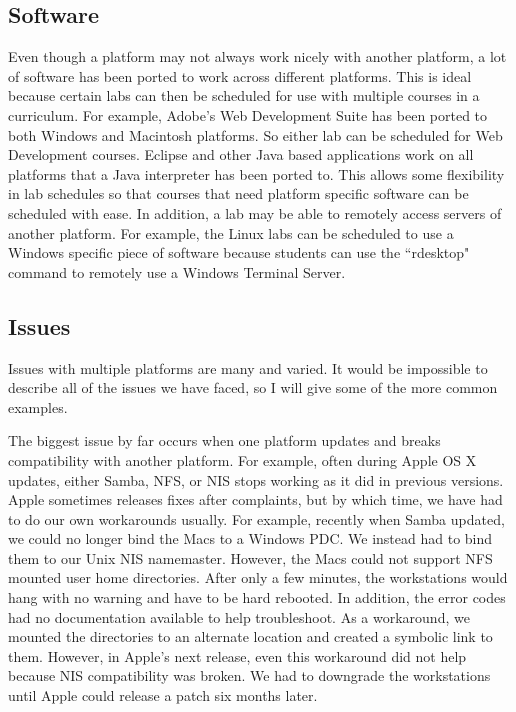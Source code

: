 \subsection{Software}
Even though a platform may not always work nicely with another platform, a lot of software has been ported to work across different platforms.  This is ideal because certain labs can then be scheduled for use with multiple courses in a curriculum.  For example, Adobe's Web Development Suite has been ported to both Windows and Macintosh platforms.  So either lab can be scheduled for Web Development courses.  Eclipse and other Java based applications work on all platforms that a Java interpreter has been ported to.  This allows some flexibility in lab schedules so that courses that need platform specific software can be scheduled with ease.  In addition, a lab may be able to remotely access servers of another platform.  For example, the Linux labs can be scheduled to use a Windows specific piece of software because students can use the ``rdesktop" command to remotely use a Windows Terminal Server.  

\subsection{Issues}
Issues with multiple platforms are many and varied.  It would be impossible to describe all of the issues we have faced, so I will give some of the more common examples.  

The biggest issue by far occurs when one platform updates and breaks compatibility with another platform.  For example, often during Apple OS X updates, either Samba, NFS, or NIS stops working as it did in previous versions.  Apple sometimes releases fixes after complaints, but by which time, we have had to do our own workarounds usually.  For example, recently when Samba updated, we could no longer bind the Macs to a Windows PDC.  We instead had to bind them to our Unix NIS namemaster.  However, the Macs could not support NFS mounted user home directories.  After only a few minutes, the workstations would hang with no warning and have to be hard rebooted.  In addition, the error codes had no documentation available to help troubleshoot.  As a workaround, we mounted the directories to an alternate location and created a symbolic link to them.  However, in Apple's next release, even this workaround did not help because NIS compatibility was broken.  We had to downgrade the workstations until Apple could release a patch six months later.


